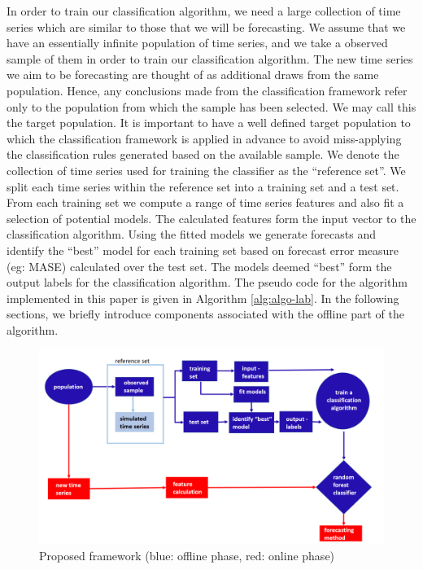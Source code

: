 \documentclass[11pt,a4paper,]{article}
\theoremstyle{definition}
\theoremstyle{definition}
\theoremstyle{definition}
\theoremstyle{remark}
\begin{document}
In order to train our classification algorithm, we need a large
collection of time series which are similar to those that we will be
forecasting. We assume that we have an essentially infinite population
of time series, and we take a observed sample of them in order to train
our classification algorithm. The new time series we aim to be
forecasting are thought of as additional draws from the same population.
Hence, any conclusions made from the classification framework refer only
to the population from which the sample has been selected. We may call
this the target population. It is important to have a well defined
target population to which the classification framework is applied in
advance to avoid miss-applying the classification rules generated based
on the available sample. We denote the collection of time series used
for training the classifier as the ``reference set''. We split each time
series within the reference set into a training set and a test set. From
each training set we compute a range of time series features and also
fit a selection of potential models. The calculated features form the
input vector to the classification algorithm. Using the fitted models we
generate forecasts and identify the ``best'' model for each training set
based on forecast error measure (eg: MASE) calculated over the test set.
The models deemed ``best'' form the output labels for the classification
algorithm. The pseudo code for the algorithm implemented in this paper
is given in Algorithm \autoref{alg:algo-lab}. In the following sections,
we briefly introduce components associated with the offline part of the
algorithm.

\begin{figure}

{\centering \includegraphics[width=\textwidth]{figures/framework} 

}

\caption{Proposed framework (blue: offline phase, red: online phase)}\label{fig:framework}
\end{figure}
\end{document}
